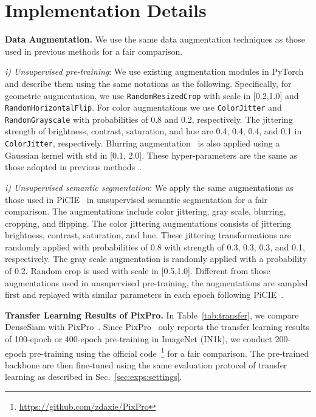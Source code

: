 \documentclass[runningheads]{llncs}
\newcommand{\myparagraph}[1]{{\noindent\bf #1}}
\begin{document}
\section{Implementation Details}
\myparagraph{Data Augmentation.} We use the same data augmentation techniques as those used in previous methods for a fair comparison.

\noindent
\emph{i) Unsupervised pre-training}:
We use existing augmentation modules in PyTorch~\cite{pytorch} and describe them using the same notations as the following.
Specifically, for geometric augmentation, we use \texttt{RandomResizedCrop} with scale in [0.2,1.0] and \texttt{RandomHorizontalFlip}.
For color augmentations we use \texttt{ColorJitter} and \texttt{RandomGrayscale} with probabilities of 0.8 and 0.2, respectively.
The jittering strength of brightness, contrast, saturation, and hue are 0.4, 0.4, 0.4, and 0.1 in \texttt{ColorJitter}, respectively.
Blurring augmentation~\cite{simclr} is also applied using a Gaussian kernel with std in [0.1, 2.0].
These hyper-parameters are the same as those adopted in previous methods~\cite{simsiam, mocov2, densecl, byol, simclr}.

\noindent
\emph{i) Unsupervised semantic segmentation}:
We apply the same augmentations as those used in PiCIE~\cite{picie} in unsupervised semantic segmentation for a fair comparison.
The augmentations include color jittering, gray scale, blurring, cropping, and flipping.
The color jittering augmentations consists of jittering brightness, contrast, saturation, and hue.
These jittering transformations are randomly applied with probabilities of 0.8 with strength of 0.3, 0.3, 0.3, and 0.1, respectively.
The gray scale augmentation is randomly applied with a probability of 0.2.
Random crop is used with scale in [0.5,1.0].
Different from those augmentations used in unsupervised pre-training,
the augmentations are sampled first and replayed with similar parameters in each epoch following PiCIE~\cite{picie}.

\myparagraph{Transfer Learning Results of PixPro.}
In Table~\ref{tab:transfer}, we compare DenseSiam with PixPro~\cite{pixpro}.
Since PixPro~\cite{pixpro} only reports the transfer learning results of 100-epoch or 400-epoch pre-training in ImageNet (IN1k),
we conduct 200-epoch pre-training using the official code~\footnote{\url{https://github.com/zdaxie/PixPro}} for a fair comparison.
The pre-trained backbone are then fine-tuned using the same evaluation protocol of transfer learning as described in Sec.~\ref{sec:exps:settings}.
  
\end{document}

